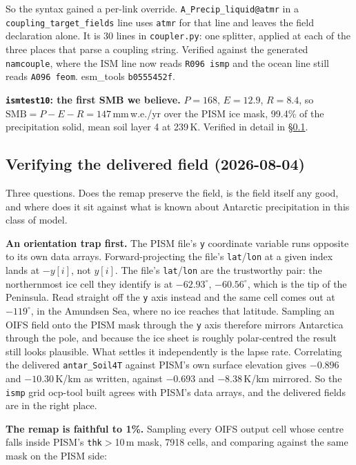 \documentclass[11pt,a4paper]{article}
\newcommand{\code}[1]{\texttt{\small #1}}
\begin{document}
So the syntax gained a per-link override. \code{A\_Precip\_liquid@atmr} in a
\code{coupling\_target\_fields} line uses \code{atmr} for that line and leaves the field
declaration alone. It is 30 lines in \code{coupler.py}: one splitter, applied at each of the three
places that parse a coupling string. Verified against the generated \code{namcouple}, where the
ISM line now reads \code{R096 ismp} and the ocean line still reads \code{A096 feom}.
esm\_tools \code{b0555452f}.

\medskip\noindent
\textbf{\code{ismtest10}: the first SMB we believe.} $P=168$, $E=12.9$, $R=8.4$, so
$\mathrm{SMB}=P-E-R=147$\,mm\,w.e./yr over the PISM ice mask, 99.4\% of the precipitation solid,
mean soil layer 4 at 239\,K. Verified in detail in \S\ref{sec:verify}.

\subsection{Verifying the delivered field (2026-08-04)}
\label{sec:verify}

Three questions. Does the remap preserve the field, is the field itself any good, and where does
it sit against what is known about Antarctic precipitation in this class of model.

\medskip\noindent
\textbf{An orientation trap first.} The PISM file's \code{y} coordinate variable runs opposite to
its own data arrays. Forward-projecting the file's \code{lat}/\code{lon} at a given index lands at
$-y[i]$, not $y[i]$. The file's \code{lat}/\code{lon} are the trustworthy pair: the northernmost
ice cell they identify is at $-62.93^\circ$, $-60.56^\circ$, which is the tip of the Peninsula. Read
straight off the \code{y} axis instead and the same cell comes out at $-119^\circ$, in the Amundsen
Sea, where no ice reaches that latitude. Sampling an OIFS field onto the PISM mask through the
\code{y} axis therefore mirrors Antarctica through the pole, and because the ice sheet is roughly
polar-centred the result still looks plausible. What settles it independently is the lapse rate.
Correlating the delivered \code{antar\_Soil4T} against PISM's own surface elevation gives $-0.896$
and $-10.30$\,K/km as written, against $-0.693$ and $-8.38$\,K/km mirrored. So the \code{ismp}
grid ocp-tool built agrees with PISM's data arrays, and the delivered fields are in the right
place.

\medskip\noindent
\textbf{The remap is faithful to 1\%.} Sampling every OIFS output cell whose centre falls inside
PISM's \code{thk}$>$10\,m mask, 7918 cells, and comparing against the same mask on the PISM side:
\end{document}
